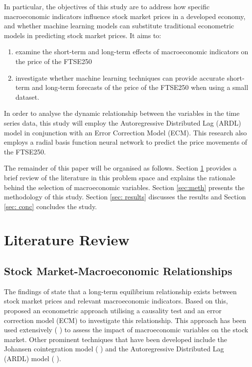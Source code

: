 \documentclass[11pt,a4paper]{article}
\newcommand{\citeboth}[1]{\citeauthor{#1} \citep{#1}}
\begin{document}
In particular, the objectives of this study are to address how specific macroeconomic indicators influence stock market prices in a developed economy, and whether machine learning models can substitute traditional econometric models in predicting stock market prices. It aims to:
\begin{enumerate}
    \item examine the short-term and long-term effects of macroeconomic indicators on the price of the FTSE250
    \item investigate whether machine learning techniques can provide accurate short-term and long-term forecasts of the price of the FTSE250 when using a small dataset.
\end{enumerate}

In order to analyse the dynamic relationship between the variables in the time series data, this study
will employ the Autoregressive Distributed Lag (ARDL) model in conjunction with an Error
Correction Model (ECM). This research also employs a radial basis function neural network to predict the price movements of the FTSE250.

The remainder of this paper will be organised as follows. 
Section \ref{sec:lit} provides a brief review of the literature in this problem space and explains the rationale behind the selection of macroeconomic variables.
Section \ref{sec:meth} presents the methodology of this study. Section \ref{sec: results} discusses the results and Section \ref{sec: conc} concludes
the study.

\section{Literature Review}
\label{sec:lit}

\subsection{Stock Market-Macroeconomic Relationships}

The findings of \citeboth{ChenRollRoss1986} state that a long-term equilibrium relationship 
exists between stock market prices and relevant macroeconomic indicators. Based on this, 
\citeboth{EngleGranger1987} proposed an econometric approach utilising a causality test and an 
error correction model (ECM) to investigate this relationship. This approach has been used extensively (\citeboth{QuadriMasih, Plíhal2016,olomu2015}) to assess the impact of macroeconomic variables on the stock market. 
Other prominent techniques that have been developed include the Johansen cointegration model (\citeboth{YadavKheraMishra2021,Ozcan2012,ChistiShakeelGanai2020}) and the Autoregressive Distributed Lag (ARDL) model (\citeboth{khan2018,demir2019,neifar2023}).
\end{document}
